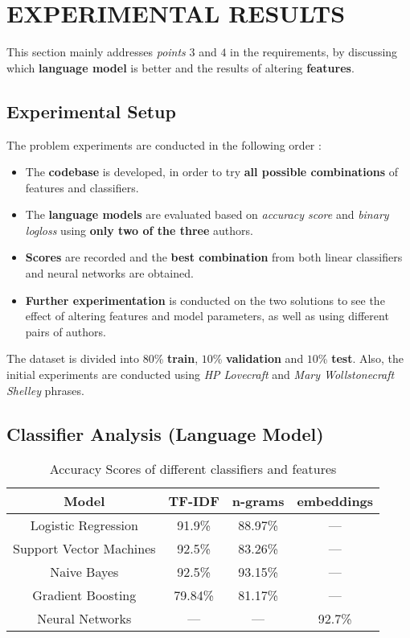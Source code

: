 \documentclass[letterpaper, 10 pt, conference]{ieeeconf}  %
\begin{document}

\section{EXPERIMENTAL RESULTS}
This section mainly addresses \emph{points} $3$ and $4$ in the requirements, by discussing which \textbf{language model} is better and the results of altering \textbf{features}.

\subsection{Experimental Setup}
The problem experiments are conducted in the following order :
\begin{itemize}
    \item The \textbf{codebase} is developed, in order to try \textbf{all possible combinations} of features and classifiers.
    \item The \textbf{language models} are evaluated based on \emph{accuracy score} and \emph{binary logloss} using \textbf{only two of the three} authors.
    \item \textbf{Scores} are recorded and the \textbf{best combination} from both linear classifiers and neural networks are obtained.
    \item \textbf{Further experimentation} is conducted on the two solutions to see the effect of altering features and model parameters, as well as using different pairs of authors.
\end{itemize}
The dataset is divided into $80$\% \textbf{train}, $10$\% \textbf{validation} and $10$\% \textbf{test}. Also, the initial experiments are conducted using \emph{HP Lovecraft} and \emph{Mary Wollstonecraft Shelley} phrases.

\subsection{Classifier Analysis (Language Model)}
\begin{table}[h!]
\centering
\begin{tabular}{||c | c | c | c||} 
 \hline
 Model & TF-IDF & n-grams & embeddings \\ [0.5ex] 
 \hline\hline
 Logistic Regression & 91.9\% & 88.97\% & --- \\ 
 \hline
 Support Vector Machines & 92.5\% & 83.26\% & --- \\
 \hline
 Naive Bayes & 92.5\% & 93.15\% & --- \\
 \hline
 Gradient Boosting & 79.84\% & 81.17\% & --- \\
 \hline
 Neural Networks & --- & --- & 92.7\% \\ [1ex] 
 \hline
\end{tabular}
\caption{Accuracy Scores of different classifiers and features}
\label{table:1}
\end{table}
\end{document}
